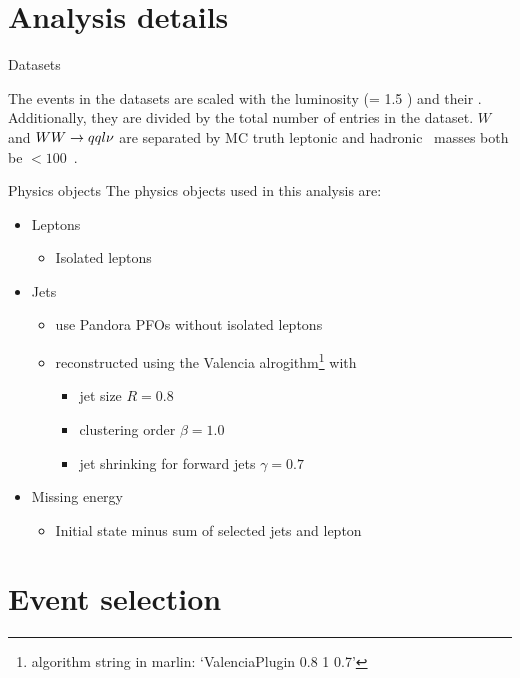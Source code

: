 \documentclass{beamer}
\newcommand{\texpath}{../analysis/tex/tex_ex}
\begin{document}
\section{Analysis details}

\begin{frame}{Datasets}

\vspace{-0.5cm}
The events in the datasets are scaled with the luminosity (\lumi = 1.5 \invab) and their \xsec.
%
Additionally, they are divided by the total number of entries in the dataset.
%
$W$ and $WW\rightarrow qql\nu$ are separated by MC truth leptonic and hadronic \Wboson\ masses both be $< 100$~\GeV.
\end{frame}


\begin{frame}{Physics objects}
The physics objects used in this analysis are:
\begin{itemize}
  \item Leptons
  \begin{itemize}
    \item Isolated leptons
  \end{itemize}
  \item Jets
  \begin{itemize}
    \item use Pandora PFOs without isolated leptons
    \item reconstructed using the Valencia alrogithm\footnote{algorithm string in marlin: `ValenciaPlugin 0.8 1 0.7'} with
    \begin{itemize}
      \item jet size $R=0.8$
      \item clustering order $\beta=1.0$
      \item jet shrinking for forward jets $\gamma=0.7$
    \end{itemize}
  \end{itemize}
  \item Missing energy
  \begin{itemize}
    \item Initial state minus sum of selected jets and lepton
  \end{itemize}
\end{itemize}
\end{frame}










\section{Event selection}
\end{document}
